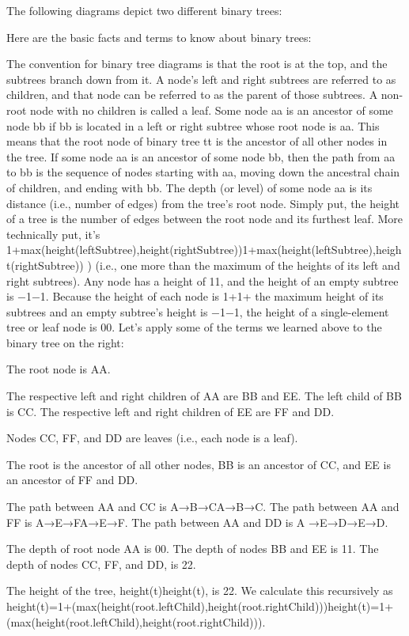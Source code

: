 The following diagrams depict two different binary trees:



Here are the basic facts and terms to know about binary trees:

The convention for binary tree diagrams is that the root is at the top, and the subtrees branch down from it.
A node's left and right subtrees are referred to as children, and that node can be referred to as the parent of those subtrees.
A non-root node with no children is called a leaf.
Some node aa is an ancestor of some node bb if bb is located in a left or right subtree whose root node is aa. This means that the root node of binary tree tt is the ancestor of all other nodes in the tree.
If some node aa is an ancestor of some node bb, then the path from aa to bb is the sequence of nodes starting with aa, moving down the ancestral chain of children, and ending with bb.
The depth (or level) of some node aa is its distance (i.e., number of edges) from the tree's root node.
Simply put, the height of a tree is the number of edges between the root node and its furthest leaf.
More technically put, it's 1+max(height(leftSubtree),height(rightSubtree))1+max(height(leftSubtree),height(rightSubtree)) ) (i.e., one more than the maximum of the heights of its left and right subtrees).
Any node has a height of 11, and the height of an empty subtree is −1−1.
Because the height of each node is 1+1+ the maximum height of its subtrees and an empty subtree's height is −1−1, the height of a single-element tree or leaf node is 00.
Let's apply some of the terms we learned above to the binary tree on the right:

The root node is AA.

The respective left and right children of AA are BB and EE. The left child of BB is CC. The respective left and right children of EE are FF and DD.

Nodes CC, FF, and DD are leaves (i.e., each node is a leaf).

The root is the ancestor of all other nodes, BB is an ancestor of CC, and EE is an ancestor of FF and DD.

The path between AA and CC is A→B→CA→B→C. The path between AA and FF is A→E→FA→E→F. The path between AA and DD is A →E→D→E→D.

The depth of root node AA is 00. The depth of nodes BB and EE is 11. The depth of nodes CC, FF, and DD, is 22.

The height of the tree, height(t)height(t), is 22. We calculate this recursively as height(t)=1+(max(height(root.leftChild),height(root.rightChild)))height(t)=1+(max(height(root.leftChild),height(root.rightChild))).

